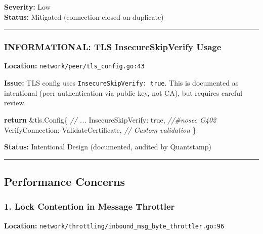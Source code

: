 \documentclass[
]{article}
\newenvironment{Shaded}{}{}
\newcommand{\CommentTok}[1]{\textcolor[rgb]{0.38,0.63,0.69}{\textit{#1}}}
\newcommand{\ControlFlowTok}[1]{\textcolor[rgb]{0.00,0.44,0.13}{\textbf{#1}}}
\newcommand{\NormalTok}[1]{#1}
\newcommand{\OperatorTok}[1]{\textcolor[rgb]{0.40,0.40,0.40}{#1}}
\newcommand{\OtherTok}[1]{\textcolor[rgb]{0.00,0.44,0.13}{#1}}
\begin{document}
\textbf{Severity:} Low\\
\textbf{Status:} Mitigated (connection closed on duplicate)

\begin{center}\rule{0.5\linewidth}{0.5pt}\end{center}

\subsubsection{INFORMATIONAL: TLS InsecureSkipVerify
Usage}\label{informational-tls-insecureskipverify-usage}

\textbf{Location:} \texttt{network/peer/tls\_config.go:43}

\textbf{Issue:} TLS config uses \texttt{InsecureSkipVerify:\ true}. This
is documented as intentional (peer authentication via public key, not
CA), but requires careful review.

\begin{Shaded}
\begin{Highlighting}[]
\ControlFlowTok{return} \OperatorTok{\&}\NormalTok{tls}\OperatorTok{.}\NormalTok{Config}\OperatorTok{\{}
    \CommentTok{// ...}
\NormalTok{    InsecureSkipVerify}\OperatorTok{:} \OtherTok{true}\OperatorTok{,} \CommentTok{//\#nosec G402}
\NormalTok{    VerifyConnection}\OperatorTok{:}\NormalTok{   ValidateCertificate}\OperatorTok{,}  \CommentTok{// Custom validation}
\OperatorTok{\}}
\end{Highlighting}
\end{Shaded}

\textbf{Status:} Intentional Design (documented, audited by Quantstamp)

\begin{center}\rule{0.5\linewidth}{0.5pt}\end{center}

\subsection{Performance Concerns}\label{performance-concerns}

\subsubsection{1. Lock Contention in Message
Throttler}\label{1-lock-contention-in-message-throttler}

\textbf{Location:}
\texttt{network/throttling/inbound\_msg\_byte\_throttler.go:96}
\end{document}
